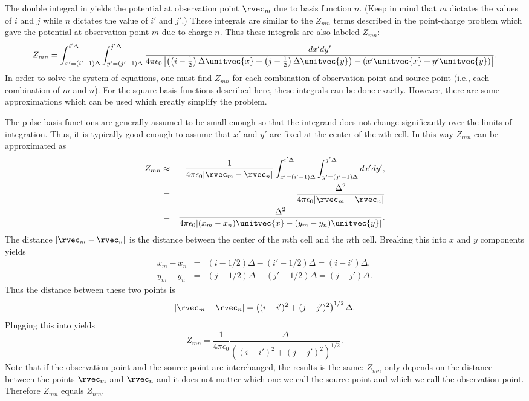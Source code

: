 The double integral in  yields the potential
at observation point $\rvec_m$ due to basis function $n$.  (Keep in mind
that $m$ dictates the values of $i$ and $j$ while $n$ dictates the
value of $i'$ and $j'$.)  These integrals are similar to the $Z_{mn}$
terms described in the point-charge problem which gave the potential
at observation point $m$ due to charge $n$.  Thus these integrals are
also labeled $Z_{mn}$:
\begin{equation}
Z_{mn} = 
  \int_{x'=(i'-1)\Delta}^{i'\Delta}\int_{y'=(j'-1)\Delta}^{j'\Delta}
  \frac{dx'dy'}{4\pi\epsilon_0
                \left|\left(\left(i-\frac{1}{2}\right)\Delta\unitvec{x}
                +\left(j-\frac{1}{2}\right)\Delta\unitvec{y}\right)
                 -(x'\unitvec{x}+y'\unitvec{y})\right|}.
  \label{eq:zmn}
\end{equation}
In order to solve the system of equations, one must find $Z_{mn}$ for
each combination of observation point and source point (i.e., each
combination of $m$ and $n$).  For the square basis functions described
here, these integrals can be done exactly.  However, there are some
approximations which can be used which greatly simplify the problem.

The pulse basis functions are generally assumed to be small enough so
that the integrand does not change significantly over the limits of
integration.  Thus, it is typically good enough to assume that $x'$
and $y'$ are fixed at the center of the $n$th cell.  In this way $Z_{mn}$
can be approximated as
\begin{eqnarray}
Z_{mn} &\approx&
  \frac{1}{4\pi\epsilon_0 |\rvec_m-\rvec_n|}
  \int_{x'=(i'-1)\Delta}^{i'\Delta}\int_{y'=(j'-1)\Delta}^{j'\Delta}
  dx'dy', \nonumber\\
 &=&  \frac{\Delta^2}{4\pi\epsilon_0|\rvec_m-\rvec_n|} \\
 &=&  \frac{\Delta^2}{4\pi\epsilon_0
            |(x_m-x_n)\unitvec{x}-(y_m-y_n)\unitvec{y}|}.
  \label{eq:zmnApprox}
\end{eqnarray}
The distance $|\rvec_m-\rvec_n|$ is the distance between the center of the
$m$th cell and the $n$th cell.  Breaking this into $x$ and $y$
components yields
\begin{eqnarray}
  x_m-x_n \!&=&\! (i-1/2)\Delta - (i'-1/2)\Delta = (i-i')\Delta, \\
  y_m-y_n \!&=&\! (j-1/2)\Delta - (j'-1/2)\Delta = (j-j')\Delta.
\end{eqnarray}
Thus the distance between these two points is
\begin{equation}
  |\rvec_m-\rvec_n| = \left((i-i')^2 + (j-j')^2\right)^{1/2}\Delta.
\end{equation}
Plugging this into  yields
\begin{equation}
  Z_{mn} =  \frac{1}{4\pi\epsilon_0}
            \frac{\Delta}{\left((i-i')^2 + (j-j')^2\right)^{1/2}}.
  \label{eq:zmnApproxI}
\end{equation}
Note that if the observation point and the source point are
interchanged, the results is the same: $Z_{mn}$ only depends on the
distance between the points $\rvec_m$ and $\rvec_n$ and it does not matter which
one we call the source point and which we call the observation point.
Therefore $Z_{mn}$ equals $Z_{nm}$.


